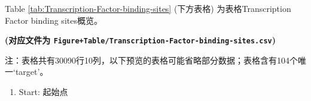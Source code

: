 \documentclass[
]{article}
\providecommand{\tightlist}{%
  \setlength{\itemsep}{0pt}\setlength{\parskip}{0pt}}
\begin{document}
Table \ref{tab:Transcription-Factor-binding-sites} (下方表格) 为表格Transcription Factor binding sites概览。

\textbf{(对应文件为 \texttt{Figure+Table/Transcription-Factor-binding-sites.csv})}

\begin{center}\begin{tcolorbox}[colback=gray!10, colframe=gray!50, width=0.9\linewidth, arc=1mm, boxrule=0.5pt]注：表格共有30090行10列，以下预览的表格可能省略部分数据；表格含有104个唯一`target'。
\end{tcolorbox}
\end{center}
\begin{center}\begin{tcolorbox}[colback=gray!10, colframe=gray!50, width=0.9\linewidth, arc=1mm, boxrule=0.5pt]\begin{enumerate}\tightlist
\item Start:  起始点
\end{enumerate}\end{tcolorbox}
\end{center}
\end{document}
